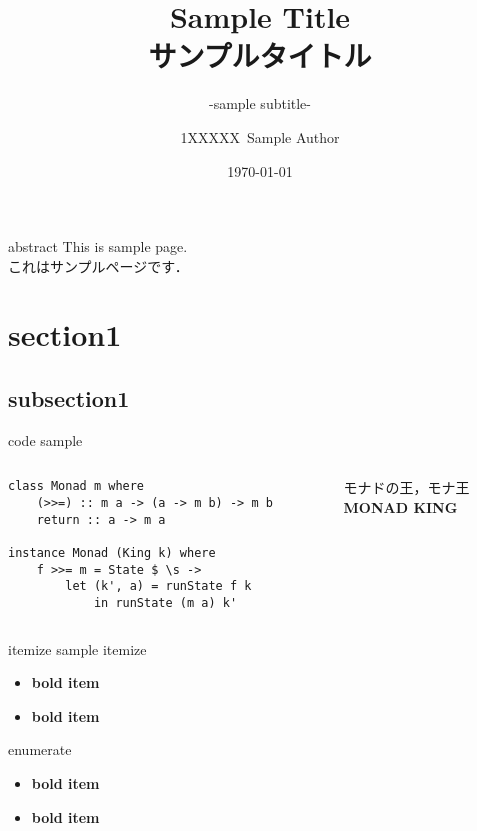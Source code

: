 \documentclass[aspectratio=1610,14pt]{beamer}
\title{%
    Sample Title \\
    サンプルタイトル
}
\subtitle{
    -sample subtitle-
}
\author{%
    1XXXXX\ Sample Author
}
\institute[Sample Univ.]{%
    Sample Univ. 
}
\date{%
    \today
}
\begin{document}
%
%
\begin{frame}
\maketitle 
\end{frame}
\begin{frame}[fragile]{abstract}
This is sample page.\\[4pt] 
これはサンプルページです．
\end{frame}

\section{section1}
\subsection{subsection1}

\begin{frame}
    \tableofcontents[currentsection]
\end{frame}

\begin{frame}[fragile]{code sample}
    \begin{columns}
        \begin{column}{0.5\textwidth}
            \begin{lstlisting}
class Monad m where 
    (>>=) :: m a -> (a -> m b) -> m b 
    return :: a -> m a

instance Monad (King k) where
    f >>= m = State $ \s ->
        let (k', a) = runState f k
            in runState (m a) k'
            \end{lstlisting}
        \end{column}
        \begin{column}{0.5\textwidth}
            モナドの王，モナ王 \\
            \textbf{MONAD KING}
        \end{column}
    \end{columns}
\end{frame}

\begin{frame}{itemize sample}
    itemize
    \begin{itemize}
        \item \textbf{bold item}
        \item \textbf{bold item}
    \end{itemize}
    \begin{block}{enumerate}
    \begin{itemize}
        \item \textbf{bold item}
        \item \textbf{bold item}
    \end{itemize}
    \end{block}

\end{frame}
\end{document}
